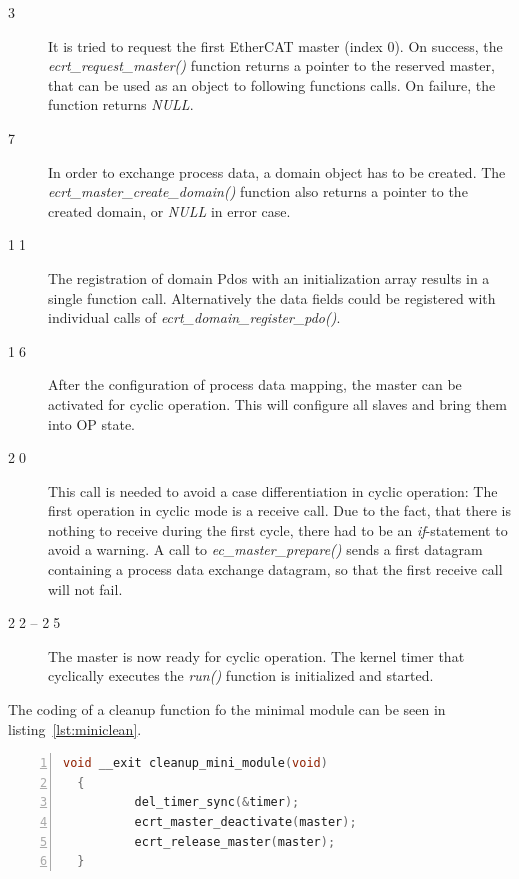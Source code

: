 \documentclass[a4paper,12pt,BCOR6mm,bibtotoc,idxtotoc]{scrbook}
\newcommand{\linenum}[1]{\normalfont\textcircled{\tiny #1}}
\begin{document}
\begin{description}
\item[\linenum{3}] It is tried to request the
  first EtherCAT master (index 0). On success, the
  \textit{ecrt\_\-request\_\-master()} function returns a pointer to
  the reserved master, that can be used as an object to following
  functions calls. On failure, the function returns \textit{NULL}.
\item[\linenum{7}] In order to exchange process
  data, a domain object has to be created. The
  \textit{ecrt\_\-master\_\-create\_domain()} function also returns a
  pointer to the created domain, or \textit{NULL} in error case.
\item[\linenum{11}] The registration of domain
  Pdos with an initialization array results in a single function call.
  Alternatively the data fields could be registered with individual
  calls of \textit{ecrt\_domain\_register\_pdo()}.
\item[\linenum{16}] After the configuration of
  process data mapping, the master can be activated for cyclic
  operation. This will configure all slaves and bring them into
  OP state.
\item[\linenum{20}] This call is needed to avoid
  a case differentiation in cyclic operation: The first operation in
  cyclic mode is a receive call. Due to the fact, that there is
  nothing to receive during the first cycle, there had to be an
  \textit{if}-statement to avoid a warning. A call to
  \textit{ec\_master\_prepare()} sends a first datagram containing a
  process data exchange datagram, so that the first receive call will
  not fail.
\item[\linenum{22} -- \linenum{25}] The
  master is now ready for cyclic operation. The kernel timer that
  cyclically executes the \textit{run()} function is initialized and
  started.
\end{description}

The coding of a cleanup function fo the minimal module can be seen in
listing~\ref{lst:miniclean}.

\begin{lstlisting}[gobble=2,language=C,numbers=left,caption={Minimal cleanup
    function},label={lst:miniclean}]
  void __exit cleanup_mini_module(void)
  {
          del_timer_sync(&timer);
          ecrt_master_deactivate(master);
          ecrt_release_master(master);
  }
\end{lstlisting}
\end{document}
